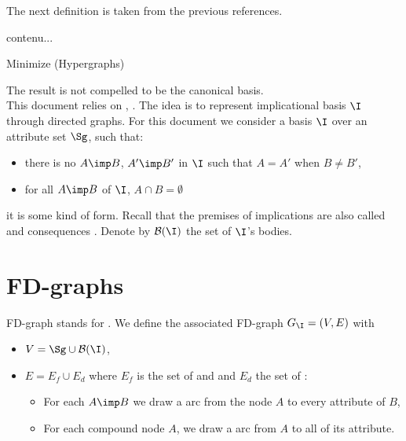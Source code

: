 The next definition is taken from the previous references.


\begin{definition}
	contenu...
\end{definition}



\begin{algorithm}[H]
	

	\caption{Minimize (Hypergraphs)}
\end{algorithm}

\vspace{1.2em}

The result is not compelled to be the canonical basis.
\\
This document relies on \cite{FD-graph}, \cite{Hyp}. The idea is to represent
implicational basis $\I$ through directed graphs. For this document we consider 
a basis $\I$ over an attribute set $\Sg$, such that:

\begin{itemize}
	\item there is no $A \imp B$, $A' \imp B'$ in $\I$ such that $A = A'$ when
	$B \neq B'$,
	\item for all $A \imp B$ of $\I$, $A \cap B = \emptyset$
\end{itemize}

\noindent it is some kind of  form. Recall that the premises of
implications are also called  and consequences .
Denote by $\mathcal{B}(\I)$ the set of $\I$'s bodies. 

\newpage

\section{FD-graphs}

FD-graph stands for . We define the 
associated FD-graph $G_{\I} = (V, E)$ with 

\begin{itemize}
	\item $V = \Sg \cup \mathcal{B}(\I)$,
	\item $E = E_f \cup E_d$ where $E_f$ is the set of  and
	and $E_d$ the set of :
	\begin{itemize}
		\item For each $A \imp B$ we draw a  arc from the node
		$A$ to every attribute of $B$,
		\item For each compound node $A$, we draw a  arc from
		$A$ to all of its attribute.
	\end{itemize}
\end{itemize}

